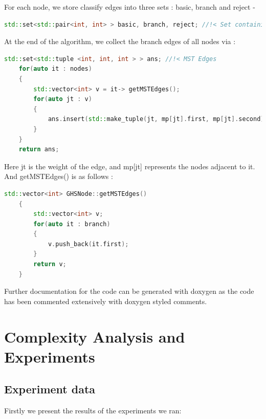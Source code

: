 \documentclass[letterpaper,11pt]{article}
\begin{document}
	For each node, we store classify edges into three sets : basic, branch and reject -
	
	
	\begin{lstlisting}[language=C++, caption= branch classification]
		std::set<std::pair<int, int> > basic, branch, reject; //!< Set containing (edge_weight, id) of edges in basic, branch and reject state respectively
	\end{lstlisting}
	
	At the end of the algorithm, we collect the branch edges of all nodes via :
	 
	\begin{lstlisting}[language=C++, caption= MST Collection]
	std::set<std::tuple <int, int, int > > ans; //!< MST Edges
	for(auto it : nodes)
	{
		std::vector<int> v = it-> getMSTEdges();
		for(auto jt : v)
		{
			ans.insert(std::make_tuple(jt, mp[jt].first, mp[jt].second));
		}
	}
	return ans;
	\end{lstlisting}
 
	Here jt is the weight of the edge, and mp[jt] represents the nodes adjacent to it. And getMSTEdges() is as follows : 
	
	
	\begin{lstlisting}[language=C++, caption= getMSTEdges()]
	std::vector<int> GHSNode::getMSTEdges()
	{
		std::vector<int> v;
		for(auto it : branch)
		{
			v.push_back(it.first);
		}
		return v;
	}
	\end{lstlisting}
	
	
	Further documentation for the code can be generated with doxygen as the code has been commented extensively with doxygen styled comments. 
	
	\section{Complexity Analysis and Experiments} 
	
	\subsection{Experiment data}
	
	Firstly we present the results of the experiments we ran: \\
	
\end{document}
